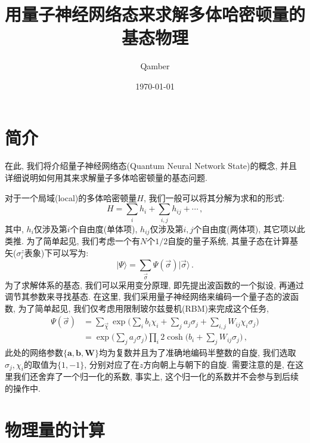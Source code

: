 \documentclass[10pt]{article}
\newcommand{\qket}{\rangle}
\begin{document}
\title{用量子神经网络态来求解多体哈密顿量的基态物理}
\author{Qamber}
\date{\today}
\maketitle

\tableofcontents
\newpage

\section{简介}

在此, 我们将介绍量子神经网络态(Quantum Neural Network State)的概念, 并且详细说明如何用其来求解量子多体哈密顿量的基态问题. 

对于一个局域(local)的多体哈密顿量$H$, 我们一般可以将其分解为求和的形式: 
\[ H = \sum_{i} h_{i} + \sum_{i,j} h_{ij} + \cdots\,, \]
其中, $h_{i}$仅涉及第$i$个自由度(单体项), $h_{ij}$仅涉及第$i,j$个自由度(两体项), 其它项以此类推. 
为了简单起见, 我们考虑一个有$N$个$1/2$自旋的量子系统, 其量子态在计算基矢($\sigma_{i}^{z}$表象)下可以写为:
\[ \lvert \Psi \qket = \sum_{\vec{\sigma}} \Psi(\vec{\sigma}) \lvert \vec{\sigma} \qket\,. \]
为了求解体系的基态, 我们可以采用变分原理, 即先提出波函数的一个拟设, 再通过调节其参数来寻找基态. 
在这里, 我们采用量子神经网络来编码一个量子态的波函数, 为了简单起见, 我们仅考虑用限制玻尔兹曼机(RBM)来完成这个任务, 
\begin{align}
\Psi(\vec{\sigma}) & = \sum_{\vec{\chi}} \exp{\Big(\sum_{i}b_{i}\chi_{i}+\sum_{j}a_{j}\sigma_{j}+\sum_{i,j}W_{ij}\chi_{i}\sigma_{j}\Big)} \nonumber \\
& = \exp{\Big(\sum_{j}a_{j}\sigma_{j}\Big)} \prod_{i} 2 \cosh{\Big(b_{i}+\sum_{j}W_{ij}\sigma_{j}\Big)}\,,
\end{align}
此处的网络参数$\{\textbf{a},\textbf{b},\textbf{W}\}$均为复数并且为了准确地编码半整数的自旋, 我们选取$\sigma_{j},\chi_{i}$的取值为$\{1,-1\}$, 分别对应了在$z$方向朝上与朝下的自旋. 
需要注意的是, 在这里我们还舍弃了一个归一化的系数, 事实上, 这个归一化的系数并不会参与到后续的操作中.

\section{物理量的计算}
\end{document}
